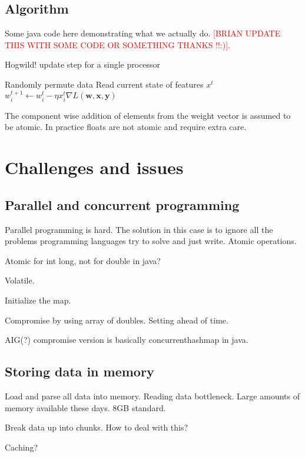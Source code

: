 \documentclass{article} %
\begin{document}
\subsection{Algorithm}
Some java code here demonstrating what we actually do. \textcolor{red}{[BRIAN UPDATE THIS WITH SOME CODE OR SOMETHING THANKS !!:)]}.
\begin{algorithm}
  \caption{Hogwild! update step for a single processor}

  \begin{algorithmic}
  \Loop
  \State Randomly permute data
  \State Read current state of features $x^t$
  \State $w^{t+1}_i \leftarrow w_i^t - \eta x_i^t \nabla L(\mathbf{w}, \mathbf{x}, \mathbf{y})$
  \EndFor
  \EndLoop
  \end{algorithmic}
\end{algorithm}
The component wise addition of elements from the weight vector is assumed to be atomic. In practice floats are not atomic and require extra care.

\section{Challenges and issues}
\label{gen_inst}
\subsection{Parallel and concurrent programming}
Parallel programming is hard. The solution in this case is to ignore all the problems programming languages try to solve and just write. Atomic operations.

Atomic for int long, not for double in java?

Volatile.

Initialize the map.

Compromise by using array of doubles. Setting ahead of time.

AIG(?) compromise version is basically concurrenthashmap in java.



\subsection{Storing data in memory}
Load and parse all data into memory. Reading data bottleneck. Large amounts of memory available these days. 8GB standard.

Break data up into chunks. How to deal with this?

Caching?
\end{document}
